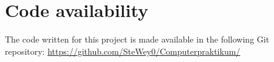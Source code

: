 \documentclass[11pt,a4paper]{article}
\begin{document}
\section{Code availability}
\label{sec:Code availability}
The code written for this project is made available in the following Git repository: \url{https://github.com/SteWey0/Computerpraktikum/}


\renewcommand\refname{Bibliography}
\printbibliography[
heading=bibintoc,
title={Bibliography}
]
\end{document}
